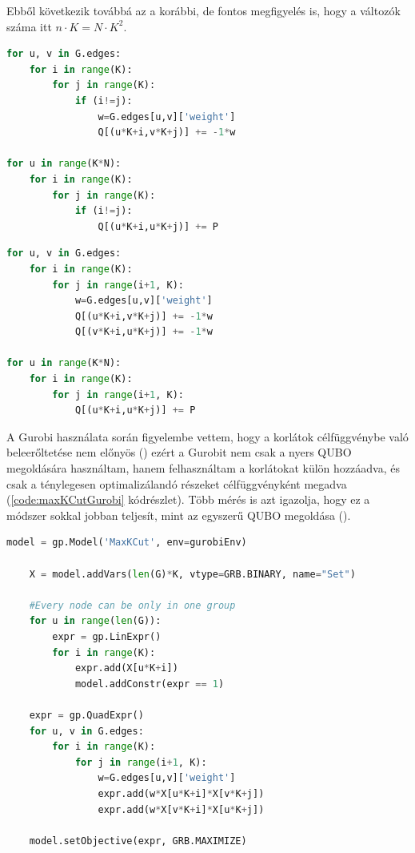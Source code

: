 Ebből következik továbbá az a korábbi, de fontos megfigyelés is, hogy a változók száma itt $n \cdot K = N \cdot K^2$.

\begin{lstlisting}[language=python,caption=Maximális K-vágás QUBO (szimmetrikus mátrix), label=code:maxKCutQUBOSymmetric]
for u, v in G.edges:
	for i in range(K):
		for j in range(K):
			if (i!=j):
				w=G.edges[u,v]['weight']
				Q[(u*K+i,v*K+j)] += -1*w

for u in range(K*N):
	for i in range(K):
		for j in range(K):
			if (i!=j):
				Q[(u*K+i,u*K+j)] += P 
\end{lstlisting}

\begin{lstlisting}[language=python,caption=Maximális K-vágás QUBO (háromszög mátrix),label=code:maxKCutQUBOTriangle]
for u, v in G.edges:
	for i in range(K):
		for j in range(i+1, K):
			w=G.edges[u,v]['weight']
			Q[(u*K+i,v*K+j)] += -1*w
			Q[(v*K+i,u*K+j)] += -1*w

for u in range(K*N):
	for i in range(K):
		for j in range(i+1, K):
			Q[(u*K+i,u*K+j)] += P
\end{lstlisting}


A Gurobi használata során figyelembe vettem, hogy a korlátok célfüggvénybe való beleerőltetése nem előnyös () ezért a Gurobit nem csak a nyers QUBO megoldására használtam, hanem felhasználtam a korlátokat külön hozzáadva, és csak a ténylegesen optimalizálandó részeket célfüggvényként megadva (\ref{code:maxKCutGurobi} kódrészlet). Több mérés is azt igazolja, hogy ez a módszer sokkal jobban teljesít, mint az egyszerű QUBO megoldása ().

\begin{lstlisting}[language=python,caption=Maximális K-vágás Gurobival ,label=code:maxKCutGurobi]
  model = gp.Model('MaxKCut', env=gurobiEnv)

	X = model.addVars(len(G)*K, vtype=GRB.BINARY, name="Set")
	
	#Every node can be only in one group
	for u in range(len(G)):
		expr = gp.LinExpr()
		for i in range(K):
			expr.add(X[u*K+i])
			model.addConstr(expr == 1)
	
	expr = gp.QuadExpr()
	for u, v in G.edges:
		for i in range(K):
			for j in range(i+1, K):
				w=G.edges[u,v]['weight']
				expr.add(w*X[u*K+i]*X[v*K+j])
				expr.add(w*X[v*K+i]*X[u*K+j])
	
	model.setObjective(expr, GRB.MAXIMIZE)
\end{lstlisting}

